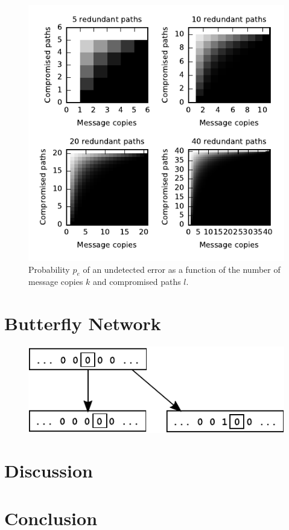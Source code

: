 \documentclass[twocolumn]{article}
\begin{document}
\begin{figure}
\includegraphics{fig-perror.pdf}
\caption{
Probability $p_e$ of an undetected error as a function of the number of message
copies $k$ and compromised paths $l$.
\label{fig:perror}
}
\end{figure}

\section{Butterfly Network}

\begin{figure}
\begin{center}
\includegraphics{fig-butterfly.pdf}
\end{center}
\caption{
\label{fig:butterfly}
}
\end{figure}

\section{Discussion}

\section{Conclusion}



\end{document}
